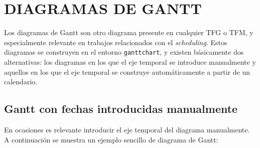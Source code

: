 \documentclass[a4paper, 11pt, spanish, twoside]{article}
\begin{document}



\section{DIAGRAMAS DE GANTT} \label{sec:gantt}

Los diagramas de Gantt son otro diagrama presente en cualquier TFG o TFM, y especialmente relevante en trabajos relacionados con el \textit{scheduling}. Estos diagramas se construyen en el entorno \texttt{ganttchart}, y existen básicamente dos alternativas: los diagramas en los que el eje temporal se introduce manualmente y aquellos en los que el eje temporal se construye automáticamente a partir de un calendario. 


\subsection{Gantt con fechas introducidas manualmente}

En ocasiones es relevante introducir el eje temporal del diagrama manualmente. A continuación se muestra un ejemplo sencillo de diagrama de Gantt:

\vspace{10pt}
\end{document}
